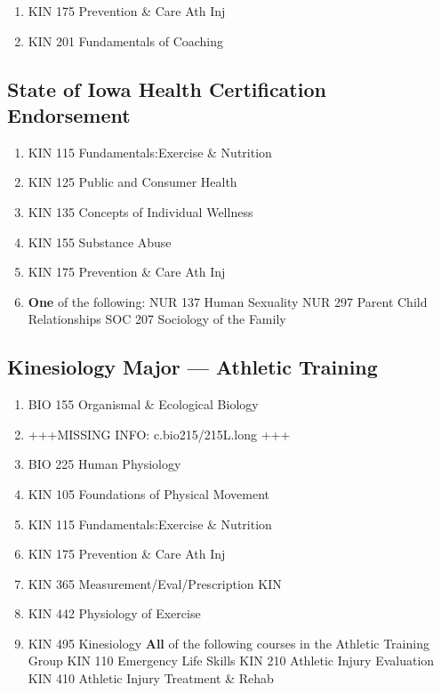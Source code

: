 \documentclass[
  letterpaper,
]{scrbook}
\providecommand{\tightlist}{%
  \setlength{\itemsep}{0pt}\setlength{\parskip}{0pt}}
\begin{document}
\begin{enumerate}
\def\labelenumi{\arabic{enumi}.}
\tightlist
\item
  KIN 175 Prevention \& Care Ath Inj
\item
  KIN 201 Fundamentals of Coaching
\end{enumerate}

\subsection{State of Iowa Health Certification
Endorsement}\label{state-of-iowa-health-certification-endorsement}

\begin{enumerate}
\def\labelenumi{\arabic{enumi}.}
\tightlist
\item
  KIN 115 Fundamentals:Exercise \& Nutrition
\item
  KIN 125 Public and Consumer Health
\item
  KIN 135 Concepts of Individual Wellness
\item
  KIN 155 Substance Abuse
\item
  KIN 175 Prevention \& Care Ath Inj
\item
  \textbf{One} of the following: NUR 137 Human Sexuality NUR 297 Parent
  Child Relationships SOC 207 Sociology of the Family
\end{enumerate}

\subsection{Kinesiology Major --- Athletic
Training}\label{kinesiology-major-athletic-training}

\begin{enumerate}
\def\labelenumi{\arabic{enumi}.}
\tightlist
\item
  BIO 155 Organismal \& Ecological Biology
\item
  +++MISSING INFO: c.bio215/215L.long +++
\item
  BIO 225 Human Physiology
\item
  KIN 105 Foundations of Physical Movement
\item
  KIN 115 Fundamentals:Exercise \& Nutrition
\item
  KIN 175 Prevention \& Care Ath Inj
\item
  KIN 365 Measurement/Eval/Prescription KIN
\item
  KIN 442 Physiology of Exercise
\item
  KIN 495 Kinesiology \textbf{All} of the following courses in the
  Athletic Training Group KIN 110 Emergency Life Skills KIN 210 Athletic
  Injury Evaluation KIN 410 Athletic Injury Treatment \& Rehab
\end{enumerate}
\end{document}
